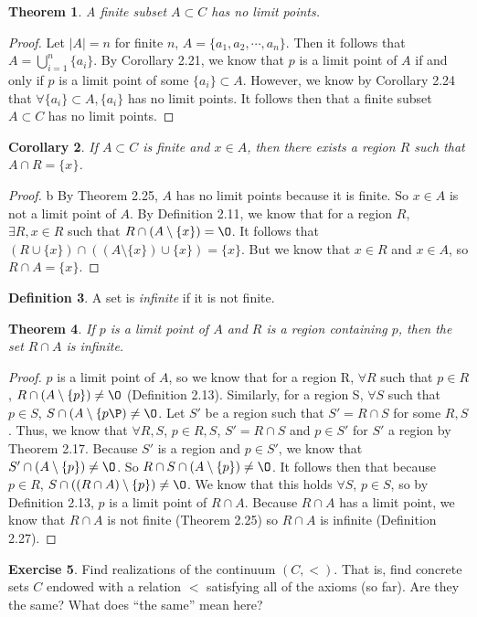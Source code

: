 \documentclass[12pt]{article}
\renewcommand{\emptyset}{\O}
\renewcommand{\_}[1]{\underline{ #1 }}
\newtheorem{theorem}{Theorem}[section]
\newtheorem{corollary}[theorem]{Corollary}
\theoremstyle{definition}
\newtheorem{definition}[theorem]{Definition}
\newtheorem{exercise}[theorem]{Exercise}
\numberwithin{equation}{subsection}
\begin{document}
\begin{theorem} A finite subset $A \subset C$ has no limit points.
\end{theorem}
\begin{proof}
Let $|A| = n$ for finite $n$, $A= \{a_1, a_2, \dotsm, a_n\}$. Then it follows that $A = \bigcup _{i=1}^n\{a_i\}$. By Corollary 2.21, we know that $p$ is a limit point of $A$ if and only if $p$ is a limit point of some $\{a_i\} \subset A$. However, we know by Corollary 2.24 that $\forall \{a_i\} \subset A, \{a_i\}$ has no limit points. It follows then that a finite subset $A \subset C$ has no limit points.
\end{proof}

\begin{corollary}  If $A \subset C$ is finite and $x \in A$, then there exists a region $R$ such that $A \cap R = \{ x \}$.
\end{corollary}
\begin{proof}b
By Theorem 2.25, $A$ has no limit points because it is finite. So $x \in A$ is not a limit point of $A$. By Definition 2.11, we know that for a region $R$, $\exists R, x \in R$ such that $R \cap (A \setminus \{x\}) = \emptyset$. It follows that $(R \cup \{x\}) \cap ((A \setminus \{x\}) \cup \{x\}) = \{x\}$. But we know that $x \in R$ and $x \in A$, so $R \cap A = \{x\}$.
\end{proof}
\begin{definition}  A set is \emph{infinite} if it is not finite.
\end{definition}

\begin{theorem}  If $p$ is a limit point of $A$ and $R$ is a region containing $p$, then the set $R \cap A$ is infinite.
\end{theorem}
\begin{proof}
$p$ is a limit point of $A$, so we know that for a region R, $\forall R$ such that $p \in R$, $R \cap (A \setminus \{p\}) \not = \emptyset$ (Definition 2.13). Similarly, for a region S, $\forall S$ such that $p \in S$, $S \cap (A \setminus \{p\P) \not = \emptyset$. Let $S'$ be a region such that $S' = R \cap S$ for some $R,S$. Thus, we know that $\forall R,S$, $p \in R,S$, $S' = R \cap S$ and $p \in S'$ for $S'$ a region by Theorem 2.17. Because $S'$ is a region and $p \in S'$, we know that $S' \cap (A \setminus \{p\}) \not = \emptyset$. So $R \cap S \cap (A \setminus \{p\}) \not = \emptyset$. It follows then that because $p \in R$, $S \cap ((R \cap A) \setminus \{p\}) \not = \emptyset$. We know that this holds $\forall S$, $p \in S$, so by Definition 2.13, $p$ is a limit point of $R \cap A$. Because $R \cap A$ has a limit point, we know that $R \cap A$ is not finite (Theorem 2.25) so $R \cap A$ is infinite (Definition 2.27).
\end{proof}
\begin{exercise}  Find realizations of the continuum $(C, <)$.  That is, find concrete sets $C$ endowed with a relation $<$ satisfying all of the axioms (so far).  Are they the same?  What does ``the same'' mean here?
\end{exercise}
\end{document}
